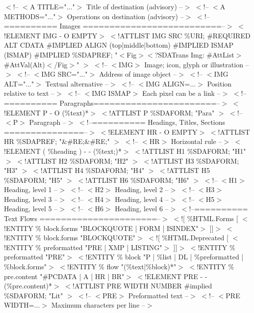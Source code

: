 $<$!-- $<$A TITLE="..."$>$    Title of destination (advisory)       --$>$
$<$!-- $<$A METHODS="..."$>$  Operations on destination (advisory)     --$>$
$<$!--========== Images ==========================--$>$
$<$!ELEMENT IMG    - O EMPTY$>$
$<$!ATTLIST IMG
        SRC \%URI;  \#REQUIRED
        ALT CDATA \#IMPLIED
        ALIGN (top|middle|bottom) \#IMPLIED
        ISMAP (ISMAP) \#IMPLIED
        \%SDAPREF; "$<$Fig$>$$<$?SDATrans Img: \#AttList$>$\#AttVal(Alt)$<$/Fig$>$"
        $>$
$<$!-- $<$IMG$>$              Image; icon, glyph or illustration      --$>$
$<$!-- $<$IMG SRC="..."$>$    Address of image object                 --$>$
$<$!-- $<$IMG ALT="..."$>$    Textual alternative                     --$>$
$<$!-- $<$IMG ALIGN=...$>$    Position relative to text               --$>$
$<$!-- $<$IMG ISMAP$>$        Each pixel can be a link                --$>$
$<$!--========== Paragraphs=======================--$>$
$<$!ELEMENT P     - O (\%text)*$>$
$<$!ATTLIST P
        \%SDAFORM; "Para"
        $>$
$<$!-- $<$P$>$        Paragraph       --$>$
$<$!--========== Headings, Titles, Sections ===============--$>$
$<$!ELEMENT HR    - O EMPTY$>$
$<$!ATTLIST HR
        \%SDAPREF; "\&\#RE;\&\#RE;"
        $>$
$<$!-- $<$HR$>$       Horizontal rule --$>$
$<$!ELEMENT ( \%heading )  - -  (\%text;)*$>$
$<$!ATTLIST H1
        \%SDAFORM; "H1"
        $>$
$<$!ATTLIST H2
        \%SDAFORM; "H2"
        $>$
$<$!ATTLIST H3
        \%SDAFORM; "H3"
        $>$
$<$!ATTLIST H4
        \%SDAFORM; "H4"
        $>$
$<$!ATTLIST H5
        \%SDAFORM; "H5"
        $>$
$<$!ATTLIST H6
        \%SDAFORM; "H6"
        $>$
$<$!-- $<$H1$>$       Heading, level 1 --$>$
$<$!-- $<$H2$>$       Heading, level 2 --$>$
$<$!-- $<$H3$>$       Heading, level 3 --$>$
$<$!-- $<$H4$>$       Heading, level 4 --$>$
$<$!-- $<$H5$>$       Heading, level 5 --$>$
$<$!-- $<$H6$>$       Heading, level 6 --$>$
$<$!--========== Text Flows ======================--$>$
$<$![ \%HTML.Forms [
        $<$!ENTITY \% block.forms "BLOCKQUOTE | FORM | ISINDEX"$>$
]]$>$
$<$!ENTITY \% block.forms "BLOCKQUOTE"$>$
$<$![ \%HTML.Deprecated [
        $<$!ENTITY \% preformatted "PRE | XMP | LISTING"$>$
]]$>$
$<$!ENTITY \% preformatted "PRE"$>$
$<$!ENTITY \% block "P | \%list | DL
        | \%preformatted
        | \%block.forms"$>$
$<$!ENTITY \% flow "(\%text|\%block)*"$>$
$<$!ENTITY \% pre.content "\#PCDATA | A | HR | BR"$>$
$<$!ELEMENT PRE - - (\%pre.content)*$>$
$<$!ATTLIST PRE
        WIDTH NUMBER \#implied
        \%SDAFORM; "Lit"
        $>$
$<$!-- $<$PRE$>$              Preformatted text               --$>$
$<$!-- $<$PRE WIDTH=...$>$    Maximum characters per line     --$>$
$$
